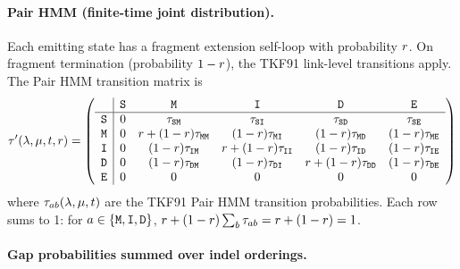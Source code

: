 \paragraph{Pair HMM (finite-time joint distribution).}
Each emitting state has a fragment extension self-loop with probability $r$.
On fragment termination (probability $1-r$), the TKF91 link-level transitions apply.
The Pair HMM transition matrix is
\[
\tau'(\lambda,\mu,t,r) =
\left(
    \begin{array}{r|ccccc}
    & {\tt S} & {\tt M} & {\tt I} & {\tt D} & {\tt E} \\
    \hline
    {\tt S} & 0 & \tau_{{\tt S}{\tt M}} & \tau_{{\tt S}{\tt I}} & \tau_{{\tt S}{\tt D}} & \tau_{{\tt S}{\tt E}} \\
    {\tt M} & 0 & r + (1-r)\tau_{{\tt M}{\tt M}} & (1-r)\tau_{{\tt M}{\tt I}} & (1-r)\tau_{{\tt M}{\tt D}} & (1-r)\tau_{{\tt M}{\tt E}} \\
    {\tt I} & 0 & (1-r)\tau_{{\tt I}{\tt M}} & r + (1-r)\tau_{{\tt I}{\tt I}} & (1-r)\tau_{{\tt I}{\tt D}} & (1-r)\tau_{{\tt I}{\tt E}} \\
    {\tt D} & 0 & (1-r)\tau_{{\tt D}{\tt M}} & (1-r)\tau_{{\tt D}{\tt I}} & r + (1-r)\tau_{{\tt D}{\tt D}} & (1-r)\tau_{{\tt D}{\tt E}} \\
    {\tt E} & 0 & 0 & 0 & 0 & 0
    \end{array}
\right)
\]
where $\tau_{ab}(\lambda,\mu,t)$ are the TKF91 Pair HMM transition probabilities.
Each row sums to 1: for $a \in \{{\tt M},{\tt I},{\tt D}\}$,
$r + (1-r)\sum_b \tau_{ab} = r + (1-r) = 1$.

\paragraph{Gap probabilities summed over indel orderings.}
\label{sec:tkf92-gapprob}

